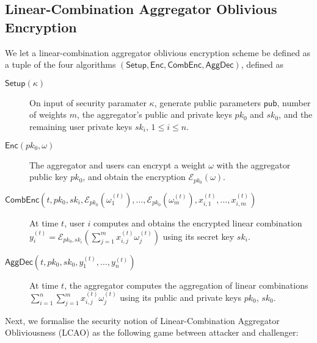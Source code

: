 \documentclass[twocolumn]{autart}
\theoremstyle{definition}
\theoremstyle{remark}
\begin{document}
% 
% 

\subsection{Linear-Combination Aggregator Oblivious Encryption} \label{subsec:lcao}
We let a linear-combination aggregator oblivious encryption scheme be defined as a tuple of the four algorithms $(\mathsf{Setup}, \mathsf{Enc}, \mathsf{CombEnc}, \mathsf{AggDec})$, defined as

\begin{description}
    \item[$\mathsf{Setup}(\kappa)$] On input of security paramater $\kappa$, generate public parameters $\mathsf{pub}$, number of weights $m$, the aggregator's public and private keys $pk_0$ and $sk_0$, and the remaining user private keys $sk_i,\,1\leq i \leq n$.
    \item[$\mathsf{Enc}(pk_0, \omega)$] The aggregator and users can encrypt a weight $\omega$ with the aggregator public key $pk_0$, and obtain the encryption $\mathcal{E}_{pk_0}(\omega)$.
    \item[$\mathsf{CombEnc}(t, pk_0, sk_i, \mathcal{E}_{pk_0}(\omega_1^{(t)}),\dots,\mathcal{E}_{pk_0}(\omega_m^{(t)}), x^{(t)}_{i,1},\dots,x^{(t)}_{i,m})$] At time $t$, user $i$ computes and obtains the encrypted linear combination $y^{(t)}_i = \mathcal{E}_{pk_0,sk_i}(\sum^m_{j=1}x^{(t)}_{i,j}\omega^{(t)}_j)$ using its secret key $sk_i$.
    \item[$\mathsf{AggDec}(t, pk_0, sk_0, y^{(t)}_1,\dots,y^{(t)}_n)$] At time $t$, the aggregator computes the aggregation of linear combinations $\sum^{n}_{i=1}\sum^{m}_{j=1} x^{(t)}_{i,j}\omega^{(t)}_j$ using its public and private keys $pk_0$, $sk_0$.
\end{description}

Next, we formalise the security notion of Linear-Combination Aggregator Obliviousness (LCAO) as the following game between attacker and challenger:
\end{document}
